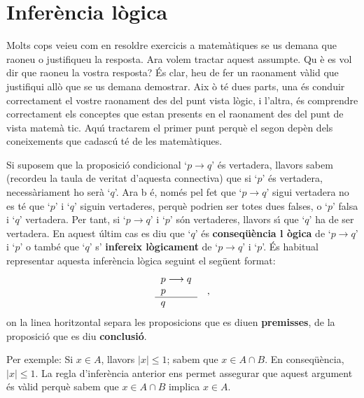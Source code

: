 \section{Infer\`{e}ncia l\`{o}gica}

Molts cops veieu com en resoldre exercicis a matem\`{a}tiques se us demana
que raoneu o justifiqueu la resposta. Ara volem tractar aquest assumpte. Qu%
\`{e} es vol dir que raoneu la vostra resposta? \'{E}s clar, heu de fer un
raonament v\`{a}lid que justifiqui all\`{o} que se us demana demostrar. Aix%
\`{o} t\'{e} dues parts, una \'{e}s conduir correctament el vostre raonament
des del punt vista l\`{o}gic, i l'altra, \'{e}s comprendre correctament els
conceptes que estan presents en el raonament des del punt de vista matem\`{a}%
tic. Aqu\'{\i} tractarem el primer punt perqu\`{e} el segon dep\`{e}n dels
coneixements que cadasc\'{u} t\'{e} de les matem\`{a}tiques.

\bigskip

Si suposem que la proposici\'{o} condicional `$p\rightarrow q$' \'{e}s
vertadera, llavors sabem (recordeu la taula de veritat d'aquesta connectiva)
que si `$p$' \'{e}s vertadera, necess\`{a}riament ho ser\`{a} `$q$'. Ara b%
\'{e}, nom\'{e}s pel fet que `$p\rightarrow q$' sigui vertadera no es t\'{e}
que `$p$' i `$q$' siguin vertaderes, perqu\`{e} podrien ser totes dues
falses, o `$p$' falsa i `$q$' vertadera. Per tant, si `$p\rightarrow q$' i `$%
p$' s\'{o}n vertaderes, llavors s\'{\i} que `$q$' ha de ser vertadera. En
aquest \'{u}ltim cas es diu que `$q$' \'{e}s \textbf{conseq\"{u}\`{e}ncia l%
\`{o}gica} de `$p\rightarrow q$' i `$p$' o tamb\'{e} que `$q$' s'\textbf{%
infereix l\`{o}gicament} de `$p\rightarrow q$' i `$p$'. \'{E}s habitual
representar aquesta infer\`{e}ncia l\`{o}gica seguint el seg\"{u}ent format:%
\begin{equation*}
\begin{tabular}{l}
$p\longrightarrow q$ \\
$p$ \\ \hline
$q$%
\end{tabular}
\ \text{,}
\end{equation*}
on la linea horitzontal separa les proposicions que es diuen \textbf{%
premisses}, de la proposici\'{o} que es diu \textbf{conclusi\'{o}}.

Per exemple: Si $x\in A$, llavors $\left\vert x\right\vert \leq1$; sabem que
$x\in A\cap B$. En conseq\"{u}\`{e}ncia, $\left\vert x\right\vert \leq1$. La
regla d'infer\`{e}ncia anterior ens permet assegurar que aquest argument
\'{e}s v\`{a}lid perqu\`{e} sabem que $x\in A\cap B$ implica $x\in A$.

